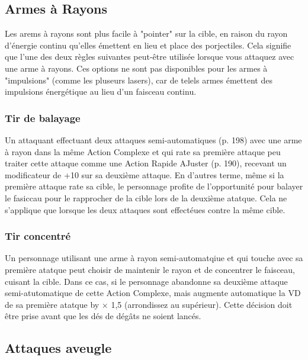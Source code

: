 \subsection{Armes à Rayons} \label{sec:combat-beam-weapons} 

Les arems à rayons sont plus facile à "pointer" sur la cible, en raison du rayon d'énergie continu qu'elles émettent en lieu et place des porjectiles. Cela signifie que l'une des deux règles suivantes peut-être utilisée lorsque vous attaquez avec une arme à rayons. Ces options ne sont pas disponibles pour les armes à "impulsions" (comme les pluseurs lasers), car de telels armes émettent des impulsions énergétique au lieu d'un faisceau continu. 

\subsubsection{Tir de balayage} 

Un attaquant effectuant deux attaques semi-automatiques (p. 198) avec une arme à rayon dans la même Action Complexe et qui rate sa première attaque peu traiter cette attaque comme une Action Rapide AJuster (p. 190), recevant un modificateur de +10 sur sa deuxième attaque. En d'autres terme, même si la première attaque rate sa cible, le personnage profite de l'opportunité pour balayer le fasiccau pour le rapprocher de la cible lors de la deuxième atatque. Cela ne s'applique que lorsque les deux attaques sont effectéues contre la même cible. 

\subsubsection{Tir concentré} 

Un personnage utilisant une arme à rayon semi-automatqiue et qui touche avec sa première atatque peut choisir de maintenir le rayon et de concentrer le faisceau, cuisant la cible. Dans ce cas, si le personnage abandonne sa deuxième attaque semi-atutomatique de cette Action Complexe, mais augmente automatique la VD de sa première atatque by $\times$ 1,5 (arrondissez au supérieur). Cette décision doit être prise avant que les dés de dégâts ne soient lancés. 



\subsection{Attaques aveugle} \label{sec:blind-attacks} 

